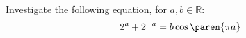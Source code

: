Investigate the following equation, for $a, b \in \mathbb{R}$:
\begin{align*}
  2^a + 2^{-a} = b \cos\paren{\pi a}
\end{align*}
